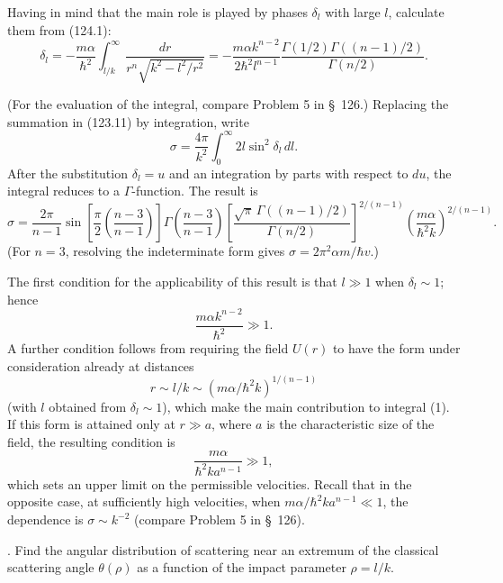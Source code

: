 \SolutionHeading Having in mind that the main role is played by phases
$\delta_l$ with large $l$, calculate them from (124.1):
\begin{equation}
 \delta_l=-\frac{m\alpha}{\hbar^2}\int_{l/k}^{\infty}\frac{dr}{r^n\sqrt{k^2-l^2/r^2}}
 =-\frac{m\alpha k^{n-2}}{2\hbar^2l^{n-1}}
 \frac{\Gamma(1/2)\Gamma((n-1)/2)}{\Gamma(n/2)}.
 \tag{1}
\end{equation}

(For the evaluation of the integral, compare Problem 5 in \S~126.) Replacing
the summation in (123.11) by integration, write
\[
 \sigma=\frac{4\pi}{k^2}\int_0^\infty2l\sin^2\delta_l\,dl.
\]
After the substitution $\delta_l=u$ and an integration by parts with respect
to $du$, the integral reduces to a $\Gamma$-function. The result is
\begin{equation}
 \sigma=\frac{2\pi}{n-1}\sin\left[\frac\pi2\left(\frac{n-3}{n-1}\right)\right]
 \Gamma\left(\frac{n-3}{n-1}\right)
 \left[\frac{\sqrt\pi\,\Gamma((n-1)/2)}{\Gamma(n/2)}\right]^{2/(n-1)}
 \left(\frac{m\alpha}{\hbar^2k}\right)^{2/(n-1)}.
 \tag{2}
\end{equation}
(For $n=3$, resolving the indeterminate form gives
$\sigma=2\pi^2\alpha m/\hbar v$.)

The first condition for the applicability of this result is that $l\gg1$
when $\delta_l\sim1$; hence
\[
 \frac{m\alpha k^{n-2}}{\hbar^2}\gg1.
\]
A further condition follows from requiring the field $U(r)$ to have the form
under consideration already at distances
\[
 r\sim l/k\sim(m\alpha/\hbar^2k)^{1/(n-1)}
\]
(with $l$ obtained from $\delta_l\sim1$), which make the main contribution to
integral (1). If this form is attained only at $r\gg a$, where $a$ is the
characteristic size of the field, the resulting condition is
\[
 \frac{m\alpha}{\hbar^2ka^{n-1}}\gg1,
\]
which sets an upper limit on the permissible velocities. Recall that in the
opposite case, at sufficiently high velocities, when
$m\alpha/\hbar^2ka^{n-1}\ll1$, the dependence is $\sigma\sim k^{-2}$
(compare Problem 5 in \S~126).

. Find the angular distribution of scattering near an
extremum of the classical scattering angle $\theta(\rho)$ as a function of
the impact parameter $\rho=l/k$.


